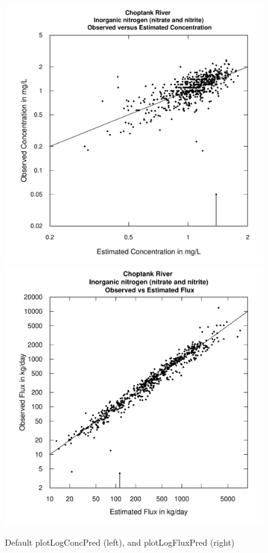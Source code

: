 \documentclass[a4paper,11pt]{article}\usepackage{graphicx, color}
\newenvironment{knitrout}{}{} %
\begin{document}
\begin{knitrout}
\color{fgcolor}\begin{figure}[]

\includegraphics[width=.5\linewidth,height=.5\linewidth]{figure/plotLogFluxPred1} 
\includegraphics[width=.5\linewidth,height=.5\linewidth]{figure/plotLogFluxPred2} \caption[Default plotLogConcPred (left), and plotLogFluxPred (right)]{Default plotLogConcPred (left), and plotLogFluxPred (right)\label{fig:plotLogFluxPred}}
\end{figure}


\end{knitrout}
\end{document}
